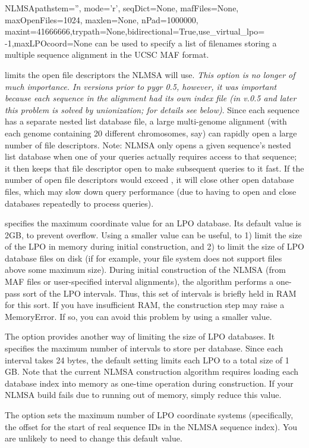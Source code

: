 \documentclass{howto}
\begin{document}
\begin{funcdesc}{NLMSA}{pathstem='', mode='r', seqDict=None, mafFiles=None, maxOpenFiles=1024, maxlen=None, nPad=1000000, maxint=41666666,trypath=None,bidirectional=True,use_virtual_lpo= -1,maxLPOcoord=None}
   can be used to specify a list of
  filenames storing a multiple sequence alignment in the UCSC MAF format.

   limits the open file descriptors the NLMSA will use.
  {\em This option is no longer of much importance.  In versions prior to pygr 0.5,
  however, it was important because each sequence in the alignment had its
  own index file (in v.0.5 and later this problem is solved by unionization;
  for details see below)}.  Since
  each sequence has a separate nested list database file, a large multi-genome alignment
  (with each genome containing 20 different chromosomes, say) can rapidly open a large
  number of file descriptors.  Note: NLMSA only opens a given sequence's nested list database
  when one of your queries actually requires access to that sequence; it then
  keeps that file descriptor open to make subsequent queries to it fast.  If the number
  of open file descriptors would exceed , it will close other open
  database files, which may slow down query performance (due to having to open and close
  databases repeatedly to process queries).

   specifies the maximum coordinate
  value for an LPO database.  Its default value is 2GB, to prevent  overflow.
  Using a smaller value can be useful, to 1) limit the size of the LPO in memory
  during initial construction, and 2) to limit the size of LPO database files on disk
  (if for example, your file system does not support files above some maximum size).
  During initial construction of the NLMSA (from MAF files or user-specified interval
  alignments), the algorithm performs a one-pass sort of the LPO intervals.  Thus,
  this set of intervals is briefly held in RAM for this sort.  If you have insufficient
  RAM, the construction step may raise a MemoryError.  If so, you can avoid this problem
  by using a smaller  value.

  The  option provides another way of limiting the size of LPO
  databases.  It specifies the maximum number of intervals to store per database.
  Since each interval takes 24 bytes, the default setting limits each LPO to
  a total size of 1 GB.  Note that the current NLMSA construction algorithm
  requires loading each database index into memory as one-time operation
  during construction.  If your NLMSA build fails due to running out of memory,
  simply reduce this value.

  The  option sets the maximum number of LPO coordinate systems
  (specifically, the offset for the start of real sequence IDs in the NLMSA
  sequence index).  You are unlikely to need to change this default value.
\end{funcdesc}
\end{document}
